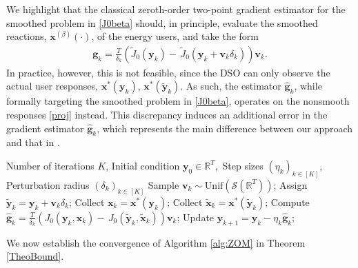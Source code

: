\documentclass[letterpaper, 10 pt, conference]{ieeeconf}
\newcommand{\real}{\mathbb{R}}
\newcommand\gbf{\mathbf{g}}
\newcommand\vbf{\mathbf{v}}
\newcommand\xbf{\mathbf{x}}
\newcommand\ybf{\mathbf{y}}
\begin{document}
We highlight that the classical zeroth-order two-point gradient estimator \cite[Eq. (30)]{nesterov2017random} for the smoothed problem in \eqref{J0beta} should, in principle, evaluate the smoothed reactions, $\xbf^{(\beta)}(\cdot)$, of the energy users, and take the form
\begin{align}\label{estimator}
     \gbf_k=\frac{T}{\delta_k}(\tilde{J}_0(\ybf_k)- \,\tilde{J}_0(\ybf_k+\vbf_k\delta_k))\vbf_k.
 \end{align}
In practice, however, this is not feasible, since the DSO can only observe the actual user responses, $\xbf^*(\ybf_k)$, $\xbf^*(\tilde{\ybf}_k)$. As such, the estimator $\hat{\gbf}_k$, while formally targeting the smoothed problem in \eqref{J0beta}, operates on the nonsmooth responses \eqref{proj} instead. This discrepancy induces an additional error in the gradient estimator $\hat{\gbf}_k$, which represents the main difference between our approach and that in \cite{maheshwari2024follower}.
 \begin{algorithm}
\caption{Zeroth-order algorithm to solve \eqref{J0beta}}\label{alg:ZOM}
\begin{algorithmic}[1]
   \Require Number of iterations $K$, Initial condition $\ybf_0 \in \real^T,$ Step sizes $(\eta_k)_{k \in [K]}$, Perturbation radius $(\delta_k)_{k \in [K]}$ 
   \State Sample $\vbf_k \sim \mathrm{Unif}(\mathcal{S}(\real^T))$;
   \State Assign $\tilde{\ybf}_k=\ybf_k + \vbf_k \delta_k$;
   \State Collect $\xbf_k=\xbf^*(\ybf_k)$;
   \State Collect $\tilde{\xbf}_k=\xbf^*(\tilde{\ybf}_k)$;
   \State Compute $\hat{\gbf}_k=\frac{T}{\delta_k}(J_0(\ybf_k,\xbf_k)- \,J_0(\tilde{\ybf}_k,\tilde{\xbf}_k))\vbf_k$;
   \State Update $\ybf_{k+1}=\ybf_k-\eta_k \hat{\gbf}_k$;
   \EndFor
\end{algorithmic}
\end{algorithm}
We now establish the convergence of Algorithm \ref{alg:ZOM} in Theorem \ref{TheoBound}. 
\end{document}
